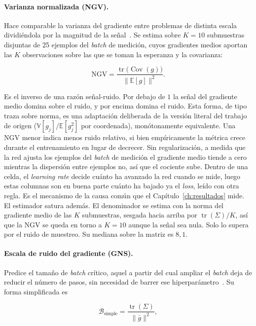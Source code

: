 \paragraph{Varianza normalizada (NGV).} Hace comparable la varianza del gradiente entre
problemas de distinta escala dividiéndola por la magnitud de la señal~\cite{faghri2020study}. Se estima sobre $K = 10$ submuestras disjuntas de 25 ejemplos del \emph{batch} de medición, cuyos gradientes medios aportan las $K$ observaciones sobre las que se toman la esperanza y la covarianza:

\begin{equation}
\mathrm{NGV} = \frac{\operatorname{tr}\!\big(\operatorname{Cov}(g)\big)}{\|\mathbb{E}[g]\|^2}.
\label{eq:ngv}
\end{equation}

Es el inverso de una razón señal-ruido. Por debajo de $1$ la señal del gradiente medio domina sobre el ruido, y por encima domina el ruido. Esta forma, de tipo traza sobre norma, es una adaptación deliberada de la versión literal del trabajo de origen ($\mathbb{V}[g_j]/\mathbb{E}[g_j^2]$ por coordenada), monótonamente equivalente. Una NGV menor indica menos ruido relativo, si bien empíricamente la métrica crece durante el entrenamiento en lugar de decrecer. Sin regularización, a medida que la red ajusta los ejemplos del \emph{batch} de medición el gradiente medio tiende a cero mientras la dispersión entre ejemplos no, así que el cociente sube. Dentro de una celda, el \emph{learning rate} decide cuánto ha avanzado la red cuando se mide, luego estas columnas son en buena parte cuánto ha bajado ya el \emph{loss}, leído con otra regla. Es el mecanismo de la causa común que el Capítulo~\ref{ch:resultados} mide. El estimador satura además. El denominador se estima con la norma del gradiente medio de las $K$ submuestras, sesgada hacia arriba por $\operatorname{tr}(\Sigma)/K$, así que la NGV se queda en torno a $K = 10$ aunque la señal sea nula. Solo lo supera por el ruido de muestreo. Su mediana sobre la matriz es $8{,}1$.

\paragraph{Escala de ruido del gradiente (GNS).} Predice el tamaño de \emph{batch} crítico, aquel
a partir del cual ampliar el \emph{batch} deja de reducir el número de pasos, sin necesidad de barrer ese hiperparámetro~\cite{mccandlish2018empirical}. Su forma simplificada es

\begin{equation}
\mathcal{B}_{\text{simple}} = \frac{\operatorname{tr}(\Sigma)}{\|\bar{g}\|^2},
\label{eq:gns}
\end{equation}

